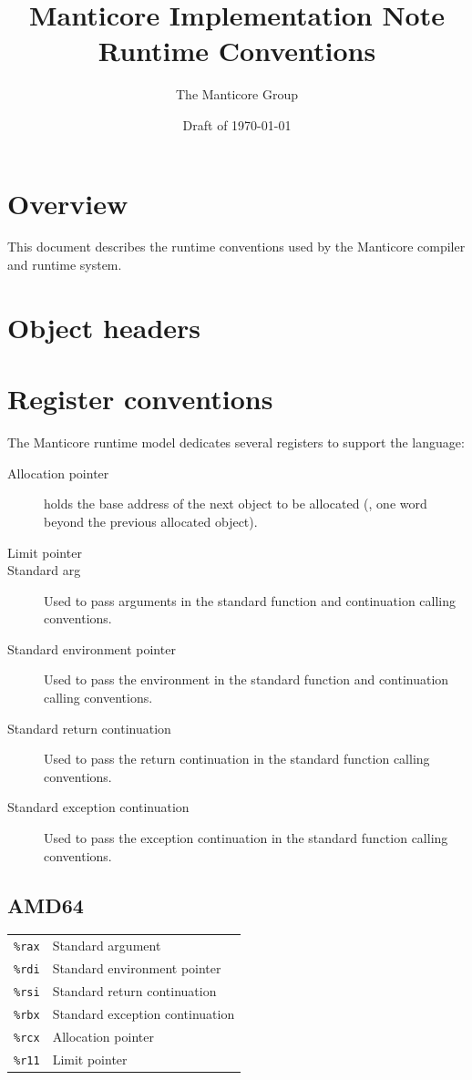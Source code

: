 \documentclass[11pt]{article}
\title{Manticore Implementation Note \\ Runtime Conventions}
\author{The Manticore Group}
\date{Draft of \today}
\begin{document}
\maketitle

\section{Overview}
This document describes the runtime conventions used
by the Manticore compiler and runtime system.

\section{Object headers}

\section{Register conventions}
The Manticore runtime model dedicates several registers to
support the language:
\begin{description}
  \item[Allocation pointer]
    holds the base address of the next object to be
    allocated (\ie{}, one word beyond the previous allocated
    object).
  \item[Limit pointer]
  \item[Standard arg]
    Used to pass arguments in the standard function and continuation
    calling conventions.
  \item[Standard environment pointer]
    Used to pass the environment in the standard function and continuation
    calling conventions.
  \item[Standard return continuation]
    Used to pass the return continuation in the standard function
    calling conventions.
  \item[Standard exception continuation]
    Used to pass the exception continuation in the standard function
    calling conventions.
\end{description}%

\subsection{AMD64}
\begin{center}
  \begin{tabular}{cl}
    \texttt{\%rax} & Standard argument \\
    \texttt{\%rdi} & Standard environment pointer \\
    \texttt{\%rsi} & Standard return continuation \\
    \texttt{\%rbx} & Standard exception continuation \\
    \texttt{\%rcx} & Allocation pointer \\
    \texttt{\%r11} & Limit pointer
  \end{tabular}%
\end{center}%
\end{document}
